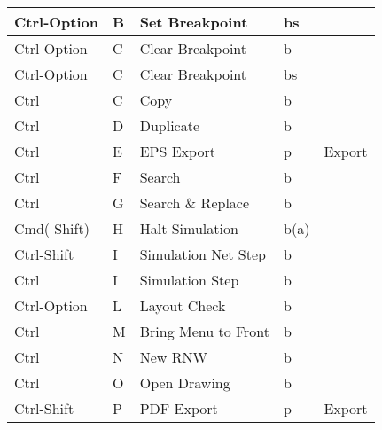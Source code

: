 \begin{longtable}{|l|l|l|l|l|}
Ctrl-Option  & B   & Set Breakpoint            & bs &                \\ \hline 
Ctrl-Option  & C   & Clear Breakpoint          & b  &                \\ \hline 
Ctrl-Option  & C   & Clear Breakpoint          & bs &                \\ \hline 
Ctrl         & C   & Copy                      & b  &                \\ \hline 
Ctrl         & D   & Duplicate                 & b  &                \\ \hline 
Ctrl         & E   & EPS Export                & p  & Export         \\ \hline 
Ctrl         & F   & Search                    & b  &                \\ \hline 
Ctrl         & G   & Search \& Replace         & b  &                \\ \hline 
Cmd(-Shift)  & H   & Halt Simulation           &b(a)&              \\ \hline 
Ctrl-Shift   & I   & Simulation Net Step       & b  &                \\ \hline 
Ctrl         & I   & Simulation Step           & b  &                \\ \hline 
Ctrl-Option  & L   & Layout Check              & b  &                \\ \hline 
Ctrl         & M   & Bring Menu to Front       & b  &                \\ \hline 
Ctrl         & N   & New RNW                   & b  &                \\ \hline 
Ctrl         & O   & Open Drawing              & b  &                \\ \hline 
Ctrl-Shift   & P   & PDF Export                & p  & Export         \\ \hline 

\end{longtable}
